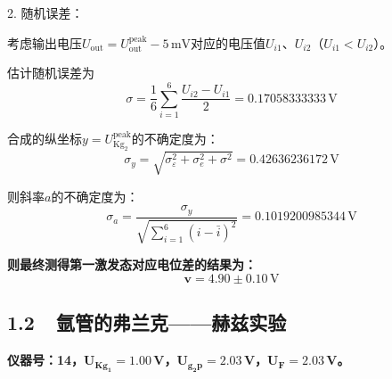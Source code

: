 \documentclass[a4paper,fontset=windows]{ctexart}
\begin{document}
    2. 随机误差：

    考虑输出电压$U_{\mathrm{out}} = U_{\mathrm{out}}^{\mathrm{peak}} - 5\,\mathrm{mV}$对应的电压值$U_{i1}$、$U_{i2}$（$U_{i1}<U_{i2}$）。

    估计随机误差为
    \[
    \sigma = \frac{1}{6}\sum_{i=1}^{6}\frac{U_{i2}-U_{i1}}{2} = 0.17058333333\,\mathrm{V}
    \]

    合成的纵坐标$y = U^{\mathrm{peak}}_{\mathrm{Kg_2}}$的不确定度为：
    \[
    \sigma_{y} = \sqrt{\sigma_\varepsilon^2 + \sigma_{e}^2 + \sigma^2} = 0.42636236172\,\mathrm{V}
    \]

    则斜率$a$的不确定度为：
    \[
    \sigma_{a} = \frac{\sigma_y}{\sqrt{\sum\limits_{i=1}^{6}\left(i-\bar{i}\right)^2}} = 0.1019200985344\,\mathrm{V}
    \]

    \textbf{则最终测得第一激发态对应电位差的结果为：}
    \[
    \boldsymbol{v = 4.90\pm0.10\,\mathrm{V}}
    \]

    \newpage
    \subsection*{1.2\ \ 氩管的弗兰克——赫兹实验}

    \textbf{仪器号：14，$\boldsymbol{U_{\mathbf{Kg_{1}}} = 1.00\,\mathbf{V}}$，$\boldsymbol{U_{\mathbf{g_{2}p}} = 2.03\,\mathbf{V}}$，$\boldsymbol{U_{\mathbf{F}} = 2.03\,\mathbf{V}}$。}
\end{document}
